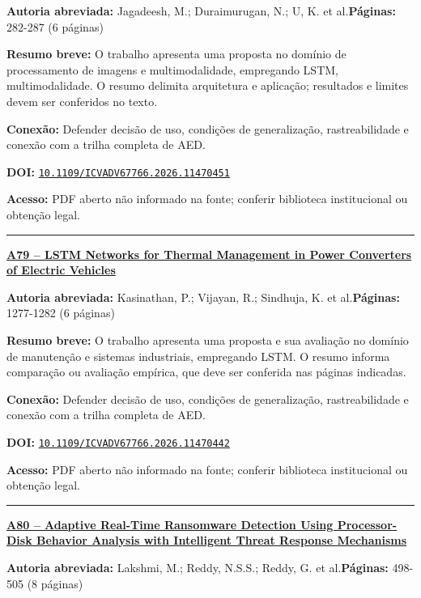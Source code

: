 \documentclass[10pt,a4paper]{article}
\begin{document}
\textbf{Autoria abreviada:} Jagadeesh, M.; Duraimurugan, N.; U, K. et al.\quad \textbf{Páginas:} 282-287 (6 páginas)\par
\textbf{Resumo breve:} O trabalho apresenta uma proposta no domínio de processamento de imagens e multimodalidade, empregando LSTM, multimodalidade. O resumo delimita arquitetura e aplicação; resultados e limites devem ser conferidos no texto.\par
\textbf{Conexão:} Defender decisão de uso, condições de generalização, rastreabilidade e conexão com a trilha completa de AED.\par
\textbf{DOI:} \href{https://doi.org/10.1109/ICVADV67766.2026.11470451}{\nolinkurl{10.1109/ICVADV67766.2026.11470451}}\par
\textbf{Acesso:} PDF aberto não informado na fonte; conferir biblioteca institucional ou obtenção legal.\par
\noindent\rule{\textwidth}{0.35pt}
\par\medskip\noindent
{\large\bfseries\href{https://doi.org/10.1109/ICVADV67766.2026.11470442}{A79 -- LSTM Networks for Thermal Management in Power Converters of Electric Vehicles}}\par\smallskip
\textbf{Autoria abreviada:} Kasinathan, P.; Vijayan, R.; Sindhuja, K. et al.\quad \textbf{Páginas:} 1277-1282 (6 páginas)\par
\textbf{Resumo breve:} O trabalho apresenta uma proposta e sua avaliação no domínio de manutenção e sistemas industriais, empregando LSTM. O resumo informa comparação ou avaliação empírica, que deve ser conferida nas páginas indicadas.\par
\textbf{Conexão:} Defender decisão de uso, condições de generalização, rastreabilidade e conexão com a trilha completa de AED.\par
\textbf{DOI:} \href{https://doi.org/10.1109/ICVADV67766.2026.11470442}{\nolinkurl{10.1109/ICVADV67766.2026.11470442}}\par
\textbf{Acesso:} PDF aberto não informado na fonte; conferir biblioteca institucional ou obtenção legal.\par
\noindent\rule{\textwidth}{0.35pt}
\par\medskip\noindent
{\large\bfseries\href{https://doi.org/10.1109/ICVADV67766.2026.11469838}{A80 -- Adaptive Real-Time Ransomware Detection Using Processor-Disk Behavior Analysis with Intelligent Threat Response Mechanisms}}\par\smallskip
\textbf{Autoria abreviada:} Lakshmi, M.; Reddy, N.S.S.; Reddy, G. et al.\quad \textbf{Páginas:} 498-505 (8 páginas)\par
\end{document}
